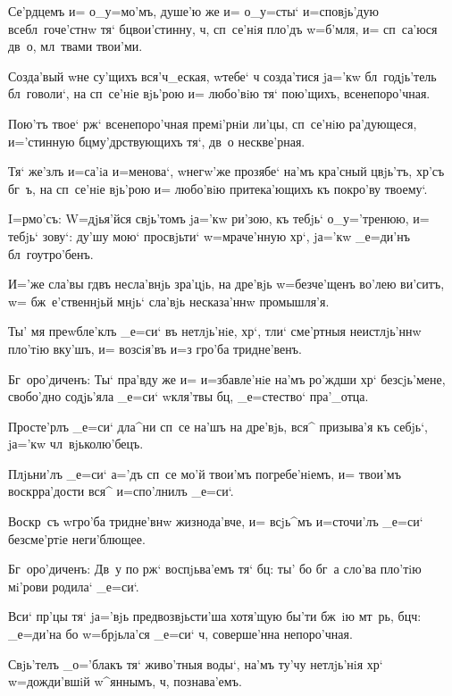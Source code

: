 Се'рдцемъ и= о_у=мо'мъ, душе'ю же и= о_у=сты` 
и=сповjь'дую всебл~гоче'стнw тя` бц вои'стинну, 
ч, сп~се'нiя пло'дъ w=б'мля, и= сп~са'юся дв~о, 
мл~твами твои'ми.

Созда'вый w\т не су'щихъ вся'ч_еская, w\т тебе` ч 
созда'тися jа='кw бл~годjь'тель бл~говоли`, на сп~се'нiе 
вjь'рою и= любо'вiю тя` пою'щихъ, всенепоро'чная. 

Пою'тъ твое` рж` всенепоро'чная премi'рнiи ли'цы, 
сп~се'нiю ра'дующеся, и='стинную бц му'дрствующихъ 
тя`, дв~о нескве'рная.

Тя` же'злъ и=са'iа и=менова`, w\т негw'же прозябе` 
на'мъ кра'сный цвjь'тъ, хр'съ бг~ъ, на сп~се'нiе 
вjь'рою и= любо'вiю притека'ющихъ къ покро'ву твоему`.


I=рмо'съ: W=дjья'йся свjь'томъ jа='кw ри'зою, къ 
тебjь` о_у='тренюю, и= тебjь` зову`: ду'шу мою` 
просвjьти` w=мраче'нную хр`, jа='кw _е=ди'нъ 
бл~гоутро'бенъ.

И='же сла'вы гд въ несла'внjь зра'цjь, на дре'вjь 
w=безче'щенъ во'лею ви'ситъ, w= бж~е'ственнjьй мнjь` 
сла'вjь несказа'ннw промышля'я.

Ты' мя преwбле'клъ _е=си` въ нетлjь'нiе, хр`, тли` 
сме'ртныя неистлjь'ннw пло'тiю вку'шъ, и= возсiя'въ и=з\ъ 
гро'ба тридне'венъ.

Бг~оро'диченъ: Ты` пра'вду же и= и=збавле'нiе на'мъ 
ро'ждши хр` без\ъ сjь'мене, свобо'дно содjь'яла 
_е=си` w\т кля'твы бц, _е=стество` пра'_отца. 


Просте'рлъ _е=си` дла^ни сп~се на'шъ на дре'вjь, вся^ 
призыва'я къ себjь`, jа='кw чл~вjьколю'бецъ.

Плjьни'лъ _е=си` а='дъ сп~се мо'й твои'мъ 
погребе'нiемъ, и= твои'мъ воскр ра'дости вся^ 
и=спо'лнилъ _е=си`.

Воскр~съ w\т гро'ба тридне'внw жизнода'вче, и= всjь^мъ 
и=сточи'лъ _е=си` безсме'ртiе неги'блющее.

Бг~оро'диченъ: Дв~у по рж` воспjьва'емъ тя` 
бц: ты' бо бг~а сло'ва пло'тiю мi'рови родила` _е=си`. 


Вси` пр'цы тя` jа='вjь предвозвjьсти'ша хотя'щую 
бы'ти бж~iю мт~рь, бц ч: _е=ди'на бо w=брjьла'ся 
_е=си` ч, соверше'нна непоро'чная.

Свjь'телъ _о='блакъ тя` живо'тныя воды`, на'мъ ту'чу 
нетлjь'нiя хр` w=дожди'вшiй w^яннымъ, ч, 
познава'емъ. 

